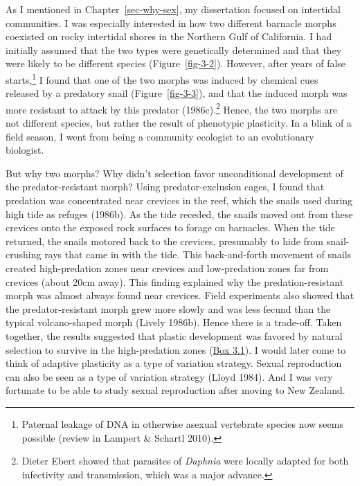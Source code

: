 \documentclass[
  letterpaper,
]{book}
\begin{document}
As I mentioned in Chapter~\ref{sec-why-sex}, my dissertation focused on
intertidal communities. I was especially interested in how two different
barnacle morphs coexisted on rocky intertidal shores in the Northern
Gulf of California. I had initially assumed that the two types were
genetically determined and that they were likely to be different species
(Figure~\ref{fig-3-2}). However, after years of false starts,\footnote{Paternal
  leakage of DNA in otherwise asexual vertebrate species now seems
  possible (review in Lampert \& Schartl 2010).} I found that one of the
two morphs was induced by chemical cues released by a predatory snail
(Figure~\ref{fig-3-3}), and that the induced morph was more resistant to
attack by this predator (1986c).\footnote{Dieter Ebert showed that
  parasites of \emph{Daphnia} were locally adapted for both infectivity
  and transmission, which was a major advance.} Hence, the two morphs
are not different species, but rather the result of phenotypic
plasticity. In a blink of a field season, I went from being a community
ecologist to an evolutionary biologist.

But why two morphs? Why didn't selection favor unconditional development
of the predator-resistant morph? Using predator-exclusion cages, I found
that predation was concentrated near crevices in the reef, which the
snails used during high tide as refuges (1986b). As the tide receded,
the snails moved out from these crevices onto the exposed rock surfaces
to forage on barnacles. When the tide returned, the snails motored back
to the crevices, presumably to hide from snail-crushing rays that came
in with the tide. This back-and-forth movement of snails created
high-predation zones near crevices and low-predation zones far from
crevices (about 20cm away). This finding explained why the
predation-resistant morph was almost always found near crevices. Field
experiments also showed that the predator-resistant morph grew more
slowly and was less fecund than the typical volcano-shaped morph (Lively
1986b). Hence there is a trade-off. Taken together, the results
suggested that plastic development was favored by natural selection to
survive in the high-predation zones (\hyperref[callout-4]{Box 3.1}). I
would later come to think of adaptive plasticity as a type of variation
strategy. Sexual reproduction can also be seen as a type of variation
strategy (Lloyd 1984). And I was very fortunate to be able to study
sexual reproduction after moving to New Zealand.
\end{document}
